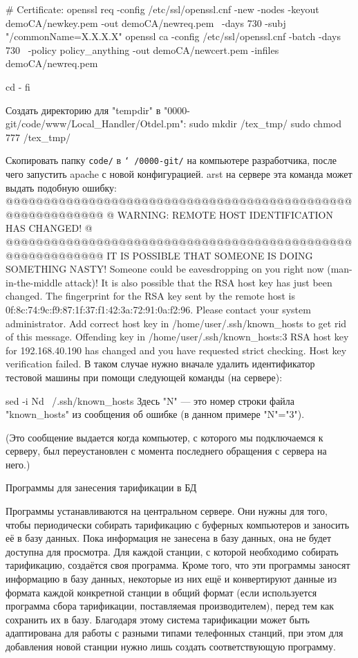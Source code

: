   # Certificate:
  openssl req -config /etc/ssl/openssl.cnf -new -nodes -keyout demoCA/newkey.pem -out demoCA/newreq.pem \
    -days 730 -subj "/commonName=X.X.X.X"
  openssl ca -config /etc/ssl/openssl.cnf -batch -days 730 \
    -policy policy_anything -out demoCA/newcert.pem -infiles demoCA/newreq.pem

  cd -
fi
\endtt
\medskip

\N
Создать директорию для "tempdir" в "0000-git/code/www/Local_Handler/Otdel.pm":
\begtt
sudo mkdir /tex_tmp/
sudo chmod 777 /tex_tmp/
\endtt
\medskip

\N
Скопировать папку {\tt code/} в {\tt \char`~/0000-git/} на компьютере разработчика, после чего запустить apache с новой конфигурацией.
\begintt
arst
\endtt
{} на сервере эта команда может выдать подобную ошибку:
\begtt
@@@@@@@@@@@@@@@@@@@@@@@@@@@@@@@@@@@@@@@@@@@@@@@@@@@@@@@@@@@
@    WARNING: REMOTE HOST IDENTIFICATION HAS CHANGED!     @
@@@@@@@@@@@@@@@@@@@@@@@@@@@@@@@@@@@@@@@@@@@@@@@@@@@@@@@@@@@
IT IS POSSIBLE THAT SOMEONE IS DOING SOMETHING NASTY!
Someone could be eavesdropping on you right now (man-in-the-middle attack)!
It is also possible that the RSA host key has just been changed.
The fingerprint for the RSA key sent by the remote host is
0f:8c:74:9c:f9:87:1f:37:f1:42:3a:72:91:0a:f2:96.
Please contact your system administrator.
Add correct host key in /home/user/.ssh/known_hosts to get rid of this message.
Offending key in /home/user/.ssh/known_hosts:3
RSA host key for 192.168.40.190 has changed and you have requested strict checking.
Host key verification failed.
\endtt
\noindent В таком случае нужно вначале удалить идентификатор тестовой машины при помощи следующей команды (на сервере): \par\nobreak
\begtt
sed -i Nd ~/.ssh/known_hosts
\endtt
\noindent Здесь "N" --- это номер строки файла "known_hosts" из сообщения об ошибке (в данном примере "N"="3"). \par
\noindent (Это сообщение выдается когда компьютер, с которого мы подключаемся к серверу, был переустановлен с момента последнего обращения с сервера на него.)

\vfill
\eject
\sec Программы для занесения тарификации в БД

\bigskip

\noindent
Программы устанавливаются на центральном сервере. Они нужны для того, чтобы периодически собирать тарификацию с буферных компьютеров и заносить её в базу данных. Пока информация не занесена в базу данных, она не будет доступна для просмотра.
\smallskip
\noindent
Для каждой станции, с которой необходимо собирать тарификацию, создаётся своя программа. Кроме
того, что эти программы заносят информацию в базу данных, некоторые из них ещё и конвертируют
данные из формата каждой конкретной станции в общий формат (если используется программа сбора
тарификации, поставляемая производителем), перед тем как сохранить их в базу. Благодаря этому
система тарификации может быть адаптирована для работы с разными типами телефонных станций, при
этом для добавления новой станции нужно лишь создать соответствующую программу.
\bigskip

